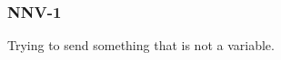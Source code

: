 \subsubsection{NNV-1}\label{sec:error_code_nnv_1}

Trying to send something that is not a variable.



